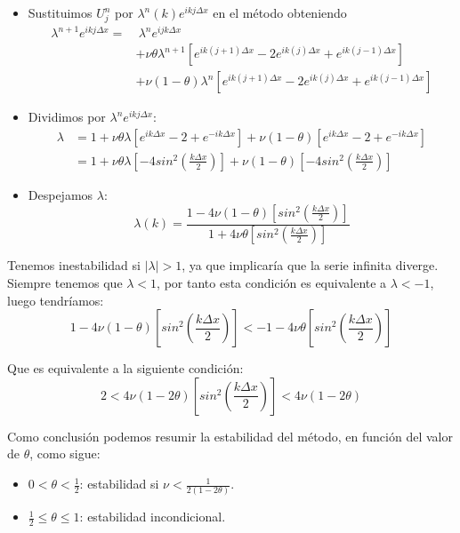 \documentclass[spanish]{mathnotes}
\begin{document}
			\begin{itemize}
				\item Sustituimos $U_j^n$ por $\lambda^n(k)e^{ikj\Delta x}$ en el método obteniendo
				\begin{align*}
					\lambda^{n+1}e^{ikj\Delta x} =&\  \lambda^ne^{ijk\Delta x}\\
					&+\nu\theta\lambda^{n+1}\left[e^{ik(j+1)\Delta x}-2e^{ik(j)\Delta x}+e^{ik(j-1)\Delta x}\right]\\
					&+\nu(1-\theta)\lambda^{n}\left[e^{ik(j+1)\Delta x}-2e^{ik(j)\Delta x}+e^{ik(j-1)\Delta x}\right]
				\end{align*}
				
				\item Dividimos por $\lambda^ne^{ikj\Delta x}$:
				\begin{align*}
					\lambda &= 1 + \nu\theta\lambda\left[e^{ik\Delta x}-2+e^{-ik\Delta x}\right] + \nu(1-\theta)\left[e^{ik\Delta x}-2+e^{-ik\Delta x}\right]\\
					&= 1 + \nu\theta\lambda\left[-4sin^2\left(\frac{k\Delta x}{2}\right)\right] + \nu(1-\theta)\left[-4sin^2\left(\frac{k\Delta x}{2}\right)\right]
				\end{align*}
				
				
				\item Despejamos $\lambda$:
				$$\lambda(k) = \frac{1-4\nu(1-\theta)\left[sin^2\left(\frac{k\Delta x}{2}\right)\right]}{1+4\nu \theta\left[sin^2\left(\frac{k\Delta x}{2}\right)\right]}$$
			\end{itemize}
			
			Tenemos inestabilidad si $\left|\lambda\right|>1$, ya que implicaría que la serie infinita diverge. Siempre tenemos que $\lambda < 1$, por tanto esta condición es equivalente a $\lambda < -1$, luego tendríamos:
			$$1-4\nu(1-\theta)\left[sin^2\left(\frac{k\Delta x}{2}\right)\right] < -1-4\nu \theta\left[sin^2\left(\frac{k\Delta x}{2}\right)\right]$$
			
			Que es equivalente a la siguiente condición:
			$$2<4\nu(1-2\theta)\left[sin^2\left(\frac{k\Delta x}{2}\right)\right] < 4\nu(1-2\theta)$$
			
			Como conclusión podemos resumir la estabilidad del método, en función del valor de $\theta$, como sigue:
			\begin{itemize}
				\item $0<\theta < \frac{1}{2}$: estabilidad si $\nu < \frac{1}{2(1-2\theta)}$.
				\item $\frac{1}{2}\le \theta \le 1$: estabilidad incondicional. 
			\end{itemize}
			
\end{document}
